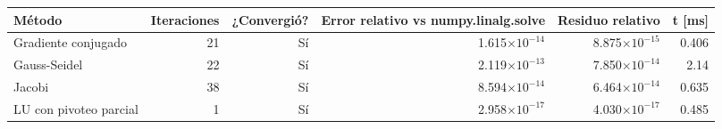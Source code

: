 {\footnotesize
\begin{longtable}{lrrrrr}
\toprule
\textbf{Método} & \textbf{Iteraciones} & \textbf{¿Convergió?} & \textbf{Error relativo vs numpy.linalg.solve} & \textbf{Residuo relativo} & \textbf{t [ms]} \\
\midrule
\endhead
Gradiente conjugado & 21 & Sí & 1.615$\times10^{-14}$ & 8.875$\times10^{-15}$ & 0.406 \\
Gauss-Seidel & 22 & Sí & 2.119$\times10^{-13}$ & 7.850$\times10^{-14}$ & 2.14 \\
Jacobi & 38 & Sí & 8.594$\times10^{-14}$ & 6.464$\times10^{-14}$ & 0.635 \\
LU con pivoteo parcial & 1 & Sí & 2.958$\times10^{-17}$ & 4.030$\times10^{-17}$ & 0.485 \\
\bottomrule
\end{longtable}
}
